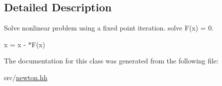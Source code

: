 \subsection{Detailed Description}
Solve nonlinear problem using a fixed point iteration. solve F(x) = 0.

x = x -\/ $\ast$F(x) 

The documentation for this class was generated from the following file:\begin{DoxyCompactItemize}
\item 
src/\hyperlink{newton_8hh}{newton.hh}\end{DoxyCompactItemize}
